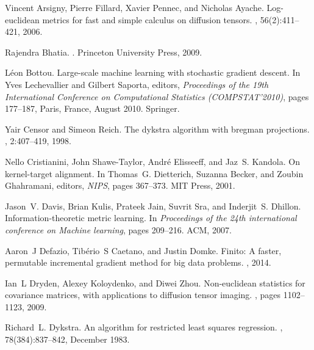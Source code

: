 \documentclass[10pt,onecolumn]{article}
\theoremstyle{definition}
\theoremstyle{definition}
\theoremstyle{definition}
\theoremstyle{definition}
\theoremstyle{definition}
\theoremstyle{theorem}
\newcommand{\0}{{\bm{0}}}
\newcommand{\1}{{\bm{1}}}
\begin{document}
 
\begin{thebibliography}{10}

Vincent Arsigny, Pierre Fillard, Xavier Pennec, and Nicholas Ayache.
\newblock Log-euclidean metrics for fast and simple calculus on diffusion
  tensors.
, 56(2):411--421, 2006.

Rajendra Bhatia.
.
\newblock Princeton University Press, 2009.

L\'{e}on Bottou.
\newblock Large-scale machine learning with stochastic gradient descent.
\newblock In Yves Lechevallier and Gilbert Saporta, editors, {\em Proceedings
  of the 19th International Conference on Computational Statistics
  (COMPSTAT'2010)}, pages 177--187, Paris, France, August 2010. Springer.

Yair Censor and Simeon Reich.
\newblock The dykstra algorithm with bregman projections.
, 2:407--419, 1998.

Nello Cristianini, John Shawe-Taylor, André Elisseeff, and Jaz~S. Kandola.
\newblock On kernel-target alignment.
\newblock In Thomas~G. Dietterich, Suzanna Becker, and Zoubin Ghahramani,
  editors, {\em NIPS}, pages 367--373. MIT Press, 2001.

Jason~V. Davis, Brian Kulis, Prateek Jain, Suvrit Sra, and Inderjit~S. Dhillon.
\newblock Information-theoretic metric learning.
\newblock In {\em Proceedings of the 24th international conference on Machine
  learning}, pages 209--216. ACM, 2007.

Aaron~J Defazio, Tib{\'e}rio~S Caetano, and Justin Domke.
\newblock Finito: A faster, permutable incremental gradient method for big data
  problems.
, 2014.

Ian~L Dryden, Alexey Koloydenko, and Diwei Zhou.
\newblock Non-euclidean statistics for covariance matrices, with applications
  to diffusion tensor imaging.
, pages 1102--1123, 2009.

Richard~L. Dykstra.
\newblock An algorithm for restricted least squares regression.
,
  78(384):837--842, December 1983.


\end{thebibliography}
\end{document}
